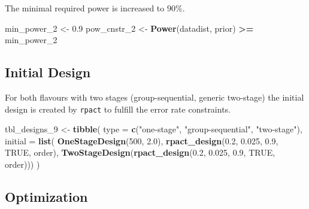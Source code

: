 \documentclass[]{book}
\newenvironment{Shaded}{\begin{snugshade}}{\end{snugshade}}
\newcommand{\DataTypeTok}[1]{\textcolor[rgb]{0.13,0.29,0.53}{#1}}
\newcommand{\DecValTok}[1]{\textcolor[rgb]{0.00,0.00,0.81}{#1}}
\newcommand{\FloatTok}[1]{\textcolor[rgb]{0.00,0.00,0.81}{#1}}
\newcommand{\KeywordTok}[1]{\textcolor[rgb]{0.13,0.29,0.53}{\textbf{#1}}}
\newcommand{\NormalTok}[1]{#1}
\newcommand{\OperatorTok}[1]{\textcolor[rgb]{0.81,0.36,0.00}{\textbf{#1}}}
\newcommand{\OtherTok}[1]{\textcolor[rgb]{0.56,0.35,0.01}{#1}}
\newcommand{\StringTok}[1]{\textcolor[rgb]{0.31,0.60,0.02}{#1}}
\begin{document}
The minimal required power is increased to \(90\%\).

\begin{Shaded}
\begin{Highlighting}[]
\NormalTok{min_power_}\DecValTok{2}\NormalTok{ <-}\StringTok{ }\FloatTok{0.9}
\NormalTok{pow_cnstr_}\DecValTok{2}\NormalTok{ <-}\StringTok{ }\KeywordTok{Power}\NormalTok{(datadist, prior) }\OperatorTok{>=}\StringTok{ }\NormalTok{min_power_}\DecValTok{2}
\end{Highlighting}
\end{Shaded}

\hypertarget{initial-design-6}{%
\subsection{Initial Design}\label{initial-design-6}}

For both flavours with two stages (group-sequential, generic two-stage)
the initial design is created by \texttt{rpact} to fulfill the error rate constraints.

\begin{Shaded}
\begin{Highlighting}[]
\NormalTok{tbl_designs_}\DecValTok{9}\NormalTok{ <-}\StringTok{ }\KeywordTok{tibble}\NormalTok{(}
    \DataTypeTok{type    =} \KeywordTok{c}\NormalTok{(}\StringTok{"one-stage"}\NormalTok{, }\StringTok{"group-sequential"}\NormalTok{, }\StringTok{"two-stage"}\NormalTok{),}
    \DataTypeTok{initial =} \KeywordTok{list}\NormalTok{(}
        \KeywordTok{OneStageDesign}\NormalTok{(}\DecValTok{500}\NormalTok{, }\FloatTok{2.0}\NormalTok{),}
        \KeywordTok{rpact_design}\NormalTok{(}\FloatTok{0.2}\NormalTok{, }\FloatTok{0.025}\NormalTok{, }\FloatTok{0.9}\NormalTok{, }\OtherTok{TRUE}\NormalTok{, order),}
        \KeywordTok{TwoStageDesign}\NormalTok{(}\KeywordTok{rpact_design}\NormalTok{(}\FloatTok{0.2}\NormalTok{, }\FloatTok{0.025}\NormalTok{, }\FloatTok{0.9}\NormalTok{, }\OtherTok{TRUE}\NormalTok{, order))) )}
\end{Highlighting}
\end{Shaded}

\hypertarget{optimization-7}{%
\subsection{Optimization}\label{optimization-7}}
\end{document}
